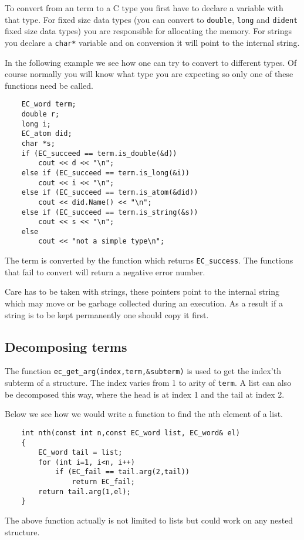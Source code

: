 To convert from an {\eclipse} term to a C type you first have to
declare a variable with that type. For fixed size data types
(you can convert to \verb.double., \verb.long. and \verb.dident.
fixed size data types) you are responsible for allocating the
memory. For strings you declare a \verb.char*. variable and
on conversion it will point to the internal {\eclipse} string.

In the following example we see how one can try to convert to
different types. Of course normally you will know what type
you are expecting so only one of these functions need be called.
\begin{verbatim}
    EC_word term;
    double r;
    long i;
    EC_atom did;
    char *s;
    if (EC_succeed == term.is_double(&d))
        cout << d << "\n";
    else if (EC_succeed == term.is_long(&i))
        cout << i << "\n";
    else if (EC_succeed == term.is_atom(&did))
        cout << did.Name() << "\n";
    else if (EC_succeed == term.is_string(&s))
        cout << s << "\n";
    else
        cout << "not a simple type\n";
\end{verbatim}

The term is converted by the function which returns \verb.EC_success..
The functions that fail to convert will return a negative error number.

Care has to be taken with strings, these pointers point to the internal
{\eclipse} string which may move or be garbage collected during an {\eclipse}
execution. As a result if a string is to be kept permanently one should
copy it first.


\subsection{Decomposing {\eclipse} terms}

The function \verb.ec_get_arg(index,term,&subterm). is used to get
the index'th subterm of a structure. The index varies from 1 to
arity of \verb.term.. A list can also be decomposed this way, where
the head is at index 1 and the tail at index 2.

Below we see how we would write a function to find the nth element of
a list.
\begin{verbatim}
    int nth(const int n,const EC_word list, EC_word& el)
    {
        EC_word tail = list;
        for (int i=1, i<n, i++)
            if (EC_fail == tail.arg(2,tail))
                return EC_fail;
        return tail.arg(1,el);
    }
\end{verbatim}
The above function actually is not limited to lists but could work
on any nested structure.



